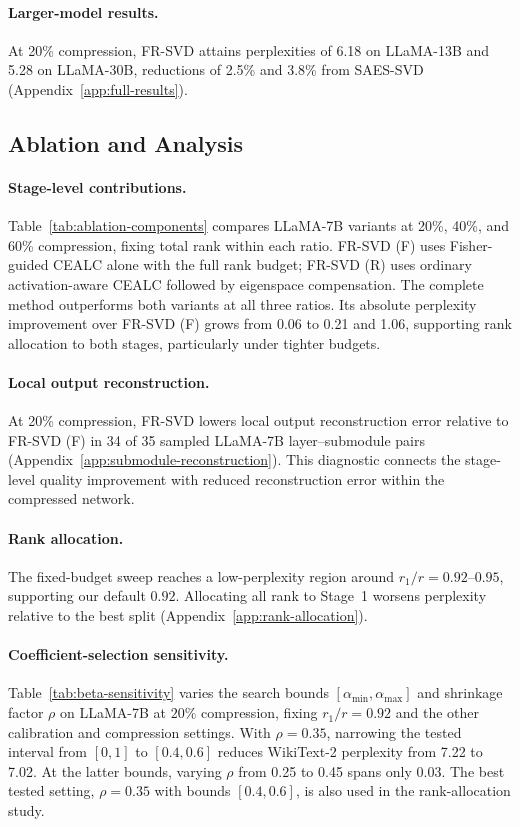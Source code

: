 \documentclass[11pt]{article}
\begin{document}
\paragraph{Larger-model results.}
At 20\% compression, FR-SVD attains perplexities of 6.18 on LLaMA-13B and 5.28 on LLaMA-30B, reductions of 2.5\% and 3.8\% from SAES-SVD (Appendix~\ref{app:full-results}).

\subsection{Ablation and Analysis}\label{sec:ablation}

\paragraph{Stage-level contributions.}

Table~\ref{tab:ablation-components} compares LLaMA-7B variants at 20\%, 40\%, and 60\% compression, fixing total rank within each ratio. FR-SVD (F) uses Fisher-guided CEALC alone with the full rank budget; FR-SVD (R) uses ordinary activation-aware CEALC followed by eigenspace compensation. The complete method outperforms both variants at all three ratios. Its absolute perplexity improvement over FR-SVD (F) grows from 0.06 to 0.21 and 1.06, supporting rank allocation to both stages, particularly under tighter budgets.



\paragraph{Local output reconstruction.}
At 20\% compression, FR-SVD lowers local output reconstruction error relative to FR-SVD (F) in 34 of 35 sampled LLaMA-7B layer--submodule pairs (Appendix~\ref{app:submodule-reconstruction}). This diagnostic connects the stage-level quality improvement with reduced reconstruction error within the compressed network.

\paragraph{Rank allocation.}
The fixed-budget sweep reaches a low-perplexity region around $r_1/r=0.92$--$0.95$, supporting our default $0.92$. Allocating all rank to Stage~1 worsens perplexity relative to the best split (Appendix~\ref{app:rank-allocation}).

\paragraph{Coefficient-selection sensitivity.}
Table~\ref{tab:beta-sensitivity} varies the search bounds $[\alpha_{\min},\alpha_{\max}]$ and shrinkage factor $\rho$ on LLaMA-7B at $20\%$ compression, fixing $r_1/r=0.92$ and the other calibration and compression settings. With $\rho=0.35$, narrowing the tested interval from $[0,1]$ to $[0.4,0.6]$ reduces WikiText-2 perplexity from 7.22 to 7.02. At the latter bounds, varying $\rho$ from 0.25 to 0.45 spans only 0.03. The best tested setting, $\rho=0.35$ with bounds $[0.4,0.6]$, is also used in the rank-allocation study.
\end{document}
